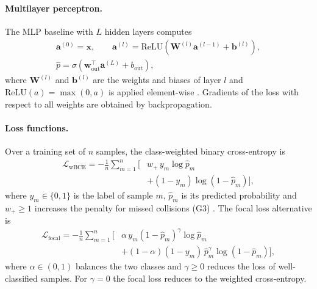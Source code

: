 \paragraph{Multilayer perceptron.}
The MLP baseline with $L$ hidden layers computes
\begin{equation}
\begin{gathered}
\mathbf{a}^{(0)} = \mathbf{x}, \qquad
\mathbf{a}^{(l)} = \mathrm{ReLU}\!\left(\mathbf{W}^{(l)}\mathbf{a}^{(l-1)} + \mathbf{b}^{(l)}\right),\\
\hat{p} = \sigma\!\left(\mathbf{w}^{\top}_{\text{out}}\mathbf{a}^{(L)} + b_{\text{out}}\right),
\end{gathered}
\label{eq:mlp}
\end{equation}
where $\mathbf{W}^{(l)}$ and $\mathbf{b}^{(l)}$ are the weights and biases of layer $l$ and $\mathrm{ReLU}(a)=\max(0,a)$ is applied element-wise \cite{goodfellow2016deep}. Gradients of the loss with respect to all weights are obtained by backpropagation.

\paragraph{Loss functions.}
Over a training set of $n$ samples, the class-weighted binary cross-entropy is
\begin{equation}
\begin{split}
\mathcal{L}_{\text{wBCE}} = -\frac{1}{n}\sum_{m=1}^{n} \Big[ & w_{+}\, y_m \log \hat{p}_m \\
& + (1-y_m)\log\left(1-\hat{p}_m\right) \Big],
\end{split}
\label{eq:wbce}
\end{equation}
where $y_m \in \{0,1\}$ is the label of sample $m$, $\hat{p}_m$ is its predicted probability and $w_{+}\geq 1$ increases the penalty for missed collisions (G3) \cite{he2009learning}. The focal loss alternative \cite{lin2017focal} is
\begin{equation}
\begin{split}
\mathcal{L}_{\text{focal}} = -\frac{1}{n}\sum_{m=1}^{n} \Big[ & \alpha\, y_m (1-\hat{p}_m)^{\gamma} \log \hat{p}_m \\
& + (1-\alpha)(1-y_m)\,\hat{p}_m^{\gamma} \log\left(1-\hat{p}_m\right) \Big],
\end{split}
\label{eq:focal}
\end{equation}
where $\alpha \in (0,1)$ balances the two classes and $\gamma \geq 0$ reduces the loss of well-classified samples. For $\gamma=0$ the focal loss reduces to the weighted cross-entropy.

